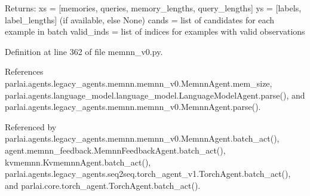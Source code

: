 \begin{DoxyVerb}Returns:
    xs = [memories, queries, memory_lengths, query_lengths]
    ys = [labels, label_lengths] (if available, else None)
    cands = list of candidates for each example in batch
    valid_inds = list of indices for examples with valid observations
\end{DoxyVerb}
 

Definition at line 362 of file memnn\+\_\+v0.\+py.



References parlai.\+agents.\+legacy\+\_\+agents.\+memnn.\+memnn\+\_\+v0.\+Memnn\+Agent.\+mem\+\_\+size, parlai.\+agents.\+language\+\_\+model.\+language\+\_\+model.\+Language\+Model\+Agent.\+parse(), and parlai.\+agents.\+legacy\+\_\+agents.\+memnn.\+memnn\+\_\+v0.\+Memnn\+Agent.\+parse().



Referenced by parlai.\+agents.\+legacy\+\_\+agents.\+memnn.\+memnn\+\_\+v0.\+Memnn\+Agent.\+batch\+\_\+act(), agent.\+memnn\+\_\+feedback.\+Memnn\+Feedback\+Agent.\+batch\+\_\+act(), kvmemnn.\+Kvmemnn\+Agent.\+batch\+\_\+act(), parlai.\+agents.\+legacy\+\_\+agents.\+seq2seq.\+torch\+\_\+agent\+\_\+v1.\+Torch\+Agent.\+batch\+\_\+act(), and parlai.\+core.\+torch\+\_\+agent.\+Torch\+Agent.\+batch\+\_\+act().

